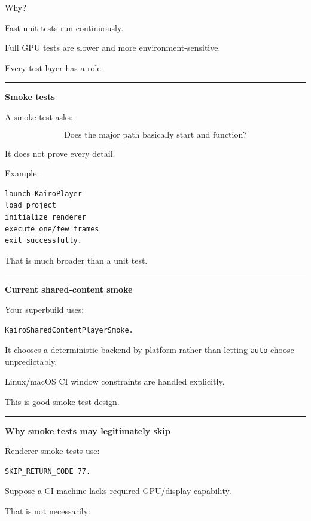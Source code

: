 Why?

Fast unit tests run continuously.

Full GPU tests are slower and more environment-sensitive.

Every test layer has a role.

\begin{center}\rule{0.5\linewidth}{0.5pt}\end{center}

\textbf{Smoke tests}

A smoke test asks:

\[
\boxed{
\text{Does the major path basically start and function?}
}
\]

It does not prove every detail.

Example:

\begin{verbatim}
launch KairoPlayer
load project
initialize renderer
execute one/few frames
exit successfully.
\end{verbatim}

That is much broader than a unit test.

\begin{center}\rule{0.5\linewidth}{0.5pt}\end{center}

\textbf{Current shared-content smoke}

Your superbuild uses:

\begin{verbatim}
KairoSharedContentPlayerSmoke.
\end{verbatim}

It chooses a deterministic backend by platform rather than letting \texttt{auto} choose unpredictably.

Linux/macOS CI window constraints are handled explicitly.

This is good smoke-test design.

\begin{center}\rule{0.5\linewidth}{0.5pt}\end{center}

\textbf{Why smoke tests may legitimately skip}

Renderer smoke tests use:

\begin{verbatim}
SKIP_RETURN_CODE 77.
\end{verbatim}

Suppose a CI machine lacks required GPU/display capability.

That is not necessarily:

